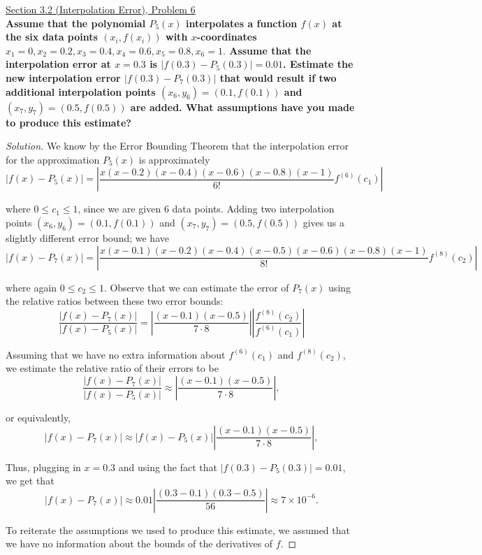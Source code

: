 \documentclass[11pt]{article}
\newenvironment{solution}
  {\renewcommand\qedsymbol{$\blacksquare$}\begin{proof}[Solution]}
  {\end{proof}}
\theoremstyle{definition}
\begin{document}
\newpage

\underline{Section 3.2 (Interpolation Error), Problem 6} \\

\textbf{Assume that the polynomial $P_5(x)$ interpolates a function $f(x)$ at the six data points $(x_i , f(x_i))$ with $x$-coordinates
$x_1 = 0, x_2 = 0.2, x_3 = 0.4, x_4 = 0.6, x_5 = 0.8, x_6 = 1.$
Assume that the interpolation error at $x = 0.3$ is $|f (0.3) - P_5(0.3)| = 0.01$. 
Estimate the new interpolation error $|f (0.3) - P_7(0.3)|$ that would result if two additional interpolation points $(x_6, y_6) = (0.1, f (0.1))$ and $(x_7, y_7) = (0.5, f (0.5))$ are added. What assumptions have you made to produce this estimate?}

\begin{solution}
We know by the Error Bounding Theorem that the interpolation error for the approximation $P_5(x)$ is approximately
\[ |f(x) - P_5(x)| = \left|\frac{x(x-0.2)(x-0.4)(x-0.6)(x-0.8)(x-1)}{6!}f^{(6)}(c_1)\right| \]

where $0 \leq c_1 \leq 1$, since we are given $6$ data points. Adding two interpolation points $(x_6, y_6) = (0.1, f(0.1))$ and $(x_7, y_7) = (0.5, f(0.5))$ gives us a slightly different error bound; we have
\[ |f(x) - P_7(x)| = \left|\frac{x(x-0.1)(x-0.2)(x-0.4)(x-0.5)(x-0.6)(x-0.8)(x-1)}{8!}f^{(8)}(c_2)\right|\]

where again $0 \leq c_2 \leq 1$. Observe that we can estimate the error of $P_7(x)$ using the relative ratios between these two error bounds:
\[ \frac{|f(x) - P_7(x)|}{|f(x) - P_5(x)|} = \left| \frac{(x-0.1)(x-0.5)}{7\cdot8}\right| \left|\frac{f^{(8)}(c_2)}{f^{(6)}(c_{1})}\right|\]

Assuming that we have no extra information about $f^{(6)}(c_1)$ and $f^{(8)}(c_2)$, we estimate the relative ratio of their errors to be
\[ \frac{|f(x) - P_7(x)|}{|f(x) - P_5(x)|} \approx \left| \frac{(x-0.1)(x-0.5)}{7\cdot8}\right|,\]

or equivalently,
\[ |f(x) - P_7(x)| \approx |f(x) - P_5(x)|\left| \frac{(x-0.1)(x-0.5)}{7\cdot8}\right|,\]

Thus, plugging in $x = 0.3$ and using the fact that $|f(0.3) - P_5(0.3)| = 0.01$, we get that
\[ |f(x) - P_7(x)| \approx 0.01 \left| \frac{(0.3-0.1)(0.3-0.5)}{56}\right| \approx \boxed{7 \times 10^{-6}}.\]

To reiterate the assumptions we used to produce this estimate, we assumed that we have no information about the bounds of the derivatives of $f$.
\end{solution}
\end{document}
